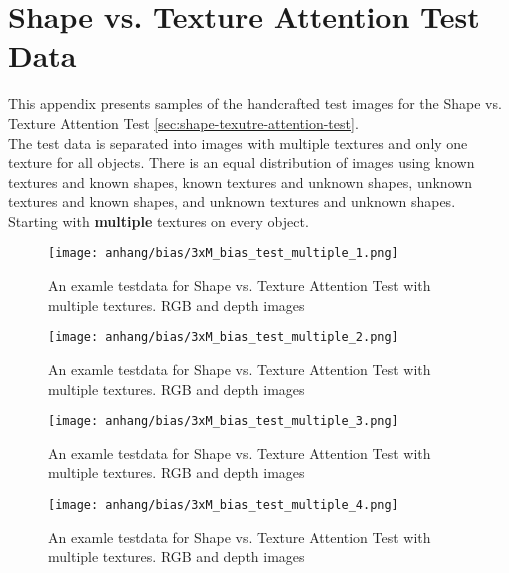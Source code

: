 \chapter{Shape vs. Texture Attention Test Data}
\label{appendix:testdata-examples-bias}

	This appendix presents samples of the handcrafted test images for the Shape vs. Texture Attention Test \ref{sec:shape-texutre-attention-test}.\\
	The test data is separated into images with multiple textures and only one texture for all objects. There is an equal distribution of images using known textures and known shapes, known textures and unknown shapes, unknown textures and known shapes, and unknown textures and unknown shapes.\\
	Starting with \textbf{multiple} textures on every object.
	
	\begin{figure}[H]
		\centering
		\texttt{[image: anhang/bias/3xM\_bias\_test\_multiple\_1.png]}
		\caption[An examle testdata for Shape vs. Texture Attention Test with multiple textures. RGB and depth images]{An examle testdata for Shape vs. Texture Attention Test with multiple textures. RGB and depth images}
	\end{figure}
	\begin{figure}[H]
		\centering
		\texttt{[image: anhang/bias/3xM\_bias\_test\_multiple\_2.png]}
		\caption[An examle testdata for Shape vs. Texture Attention Test with multiple textures. RGB and depth images]{An examle testdata for Shape vs. Texture Attention Test with multiple textures. RGB and depth images}
	\end{figure}
	\begin{figure}[H]
		\centering
		\texttt{[image: anhang/bias/3xM\_bias\_test\_multiple\_3.png]}
		\caption[An examle testdata for Shape vs. Texture Attention Test with multiple textures. RGB and depth images]{An examle testdata for Shape vs. Texture Attention Test with multiple textures. RGB and depth images}
	\end{figure}
	\begin{figure}[H]
		\centering
		\texttt{[image: anhang/bias/3xM\_bias\_test\_multiple\_4.png]}
		\caption[An examle testdata for Shape vs. Texture Attention Test with multiple textures. RGB and depth images]{An examle testdata for Shape vs. Texture Attention Test with multiple textures. RGB and depth images}
	\end{figure}
	
